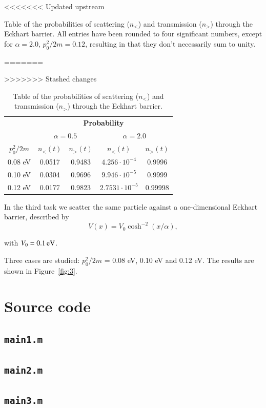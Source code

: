 \begin{table}[H]
	\centering
<<<<<<< Updated upstream
	\caption{Table of the probabilities of scattering ($n_<$) and transmission ($n_>$) through the Eckhart barrier. All entries have been rounded to four significant numbers, except for $\alpha = 2.0$, $p_0^2/2m = 0.12$, resulting in that they don't necessarily sum to unity.}
=======
	\caption{Table of the probabilities of scattering ($n_<$) and transmission ($n_>$) through the Eckhart barrier.}
>>>>>>> Stashed changes
	\begin{tabular}{c|cc|cc}
					& \multicolumn{4}{c}{\textbf{Probability}} \\
					& \multicolumn{2}{c|}{$\alpha = 0.5$} & \multicolumn{2}{c}{$\alpha = 2.0$} \\
		$p_0^2/2m$	& $n_<(t)$	& $n_>(t)$	& $n_<(t)$	& $n_>(t)$	\\ \hline
		0.08 eV		& 0.0517	& 0.9483	& $4.256 \cdot 10^{-4}$	& 0.9996	\\
		0.10 eV		& 0.0304	& 0.9696	& $9.946 \cdot 10^{-5}$	& 0.9999	\\
		0.12 eV		& 0.0177	& 0.9823	& $2.7531 \cdot 10^{-5}$ & 0.99998
	\end{tabular}
	\label{tab:3}
\end{table}

In the third task we scatter the same particle against a one-dimensional Eckhart barrier, described by
\begin{equation}
V(x) = V_0 \cosh^{-2} (x/\alpha),
\end{equation}


with $V_0 = \unit[0.1]{eV}$.

Three cases are studied: $p_0^2/2m$ = 0.08 eV, 0.10 eV and 0.12 eV. The results are shown in Figure~\ref{fig:3}.








\appendix
\section{Source code}

\subsection{\texttt{main1.m}}


\subsection{\texttt{main2.m}}


\subsection{\texttt{main3.m}}


%

